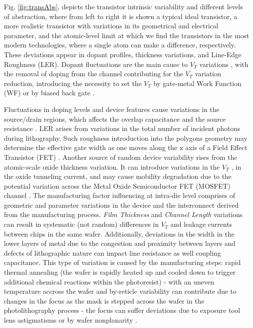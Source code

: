 \documentclass[diss,pgmicro,english]{iiufrgs}
\begin{document}
\begin{itemize}
Fig. \ref{fig:transAbs}, depicts the transistor intrinsic variability and different levels of abstraction, where from left to right it is shown a typical ideal transistor, a more realistic transistor with variations in its geometrical and electrical parameter, and the atomic-level limit at which we find the transistors in the most modern technologies, where a single atom can make a difference, respectively. These deviations appear in dopant profiles, thickness variations, and Line-Edge Roughness (LER). Dopant fluctuations are the main cause to $V_T$ variations \cite{asenov2003simulation}, with the removal of doping from the channel contributing for the $V_T$ variation reduction, introducing the necessity to set the $V_T$ by gate-metal Work Function (WF) or by biased back gate \cite{frank2001device,wong1999nanoscale}.

Fluctuations in doping levels and device features cause variations in the source/drain regions, which affects the overlap capacitance and the source resistance \cite{frank2000simulation}. LER arises from variations in the total number of incident photons during lithography. Such roughness introduction into the polygons geometry may determine the effective gate width as one moves along the x axis of a Field Effect Transistor (FET) \cite{brunner2003optical}. Another source of random device variability rises from the atomic-scale oxide thickness variation. It can introduce variations in the $V_T$ \cite{asenov2003simulation}, in the oxide tunneling current, and may cause mobility degradation due to the potential variation across the Metal Oxide Semiconductor FET (MOSFET) channel \cite{bernstein2006high}.
The manufacturing factor influencing at intra-die level comprises of geometric and parameter variations in the device and the interconnect derived from the manufacturing process. \textit{Film Thickness} and \textit{Channel Length} variations can result in systematic (not random) differences in $V_T$ and leakage currents between chips in the same wafer. Additionally, deviations in the width in the lower layers of metal due to the congestion and proximity between layers and defects of lithographic nature can impact line resistance as well coupling capacitance. This type of variation is caused by the manufacturing steps: rapid thermal annealing (the wafer is rapidly heated up and cooled down to trigger additional chemical reactions within the photoresist) - with an uneven temperature accross the wafer and by-reticle variability can contribute due to changes in the focus as the mask is stepped across the wafer in the photolithography process - the focus can suffer deviations due to exposure tool lens astigmatisms or by wafer nonplanarity \cite{bernstein2006high, qian2015variability}.

\end{itemize}
\end{document}
